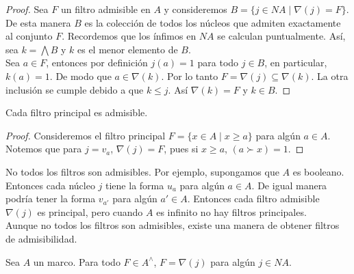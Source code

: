 \begin{proof}
    Sea $F$ un filtro admisible en $A$ y consideremos $B=\{j\in NA\mid \nabla(j)=F\}$. De esta manera $B$ es la colección de todos los núcleos que admiten exactamente al conjunto $F$. Recordemos que los ínfimos en $NA$ se calculan puntualmente. Así, sea $k=\bigwedge B$ y $k$ es el menor elemento de $B$.\\

    Sea $a\in F$, entonces por definición $j(a)=1$ para todo $j\in B$, en particular, $k(a)=1$. De modo que $a\in \nabla(k)$. Por lo tanto $F=\nabla(j)\subseteq \nabla(k)$. La otra inclusión se cumple debido a que $k\leq j$. Así $\nabla(k)=F$ y $k\in B$.
\end{proof}

\begin{lem}
    Cada filtro principal es admisible.
\end{lem}

\begin{proof}
    Consideremos el filtro principal $F=\{x\in A\mid x\geq a\}$ para algún $a\in A$. Notemos que para $j=v_a$, $\nabla(j)=F$, pues si $x\geq a$, $(a\succ x)=1$. 
\end{proof}

No todos los filtros son admisibles. Por ejemplo, supongamos que $A$ es booleano. Entonces cada núcleo $j$ tiene la forma $u_a$ para algún $a\in A$. De igual manera podría tener la forma $v_{a'}$ para algún $a'\in A$. Entonces cada filtro admisible $\nabla(j)$ es principal, pero cuando $A$ es infinito no hay filtros principales.\\

Aunque no todos los filtros son admisibles, existe una manera de obtener filtros de admisibilidad.
\begin{lem}\label{Lema5.5.4}
    Sea $A$ un marco. Para todo $F\in A^\wedge$, $F=\nabla(j)$ para algún $j\in NA$.
\end{lem}

